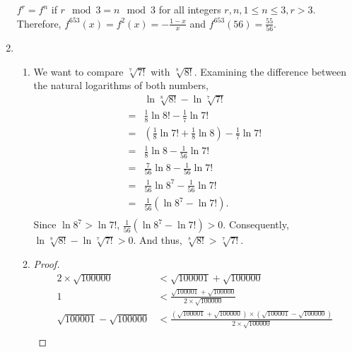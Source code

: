 \documentclass{article}
\begin{document}
\begin{enumerate}[label=(\roman*)]
          $f^r = f^n$ if $r \mod 3 = n \mod 3$ for all integers $r, n, 1 \le n \le 3, r > 3$.
          Therefore, $\displaystyle f^{653}(x) = f^2(x) = -\frac{1-x}{x}$ and
          $\displaystyle f^{653}(56) = \frac{55}{56}$.
    \item \begin{enumerate}[label=(\alph*)]
              \item We want to compare $\sqrt[7]{7!}$ with $\sqrt[8]{8!}$. Examining the difference
                    between the natural logarithms of both numbers,
                    \begin{align*}
                          & \ln{\sqrt[8]{8!}} - \ln{\sqrt[7]{7!}}                         \\
                        = & \frac{1}{8}\ln{8!} - \frac{1}{7}\ln{7!}                       \\
                        = & (\frac{1}{8}\ln{7!} + \frac{1}{8}\ln{8}) - \frac{1}{7}\ln{7!} \\
                        = & \frac{1}{8}\ln{8} - \frac{1}{56}\ln{7!}                       \\
                        = & \frac{7}{56}\ln{8} - \frac{1}{56}\ln{7!}                      \\
                        = & \frac{1}{56}\ln{8^7} - \frac{1}{56}\ln{7!}                    \\
                        = & \frac{1}{56}(\ln{8^7} - \ln{7!}).                             \\
                    \end{align*}
                    Since $\ln{8^7} > \ln{7!}$,
                    $\displaystyle \frac{1}{56}(\ln{8^7} - \ln{7!}) > 0$. Consequently,
                    $\ln{\sqrt[8]{8!}} - \ln{\sqrt[7]{7!}} > 0$. And thus,
                    $\sqrt[8]{8!} > \sqrt[7]{7!}$.
              \item \begin{proof}
                        \begin{align*}
                            2\times\sqrt{100000}          & < \sqrt{100001} + \sqrt{100000}                                                                     \\
                            1                             & < \frac{\sqrt{100001} + \sqrt{100000}}{2\times\sqrt{100000}}                                        \\
                            \sqrt{100001} - \sqrt{100000} & < \frac{(\sqrt{100001} + \sqrt{100000})\times(\sqrt{100001} - \sqrt{100000})}{2\times\sqrt{100000}} \\

\end{align*}
\end{proof}
\end{enumerate}
\end{enumerate}
\end{document}
